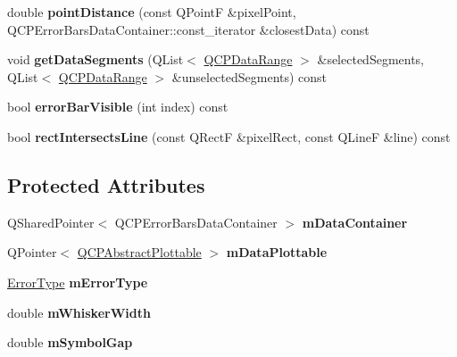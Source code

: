 \begin{DoxyCompactItemize}
\item 
double {\bfseries point\+Distance} (const Q\+PointF \&pixel\+Point, Q\+C\+P\+Error\+Bars\+Data\+Container\+::const\+\_\+iterator \&closest\+Data) const \hypertarget{classQCPErrorBars_a6701c510c6a0ad95d3335c6f2470eca0}{}\label{classQCPErrorBars_a6701c510c6a0ad95d3335c6f2470eca0}

\item 
void {\bfseries get\+Data\+Segments} (Q\+List$<$ \hyperlink{classQCPDataRange}{Q\+C\+P\+Data\+Range} $>$ \&selected\+Segments, Q\+List$<$ \hyperlink{classQCPDataRange}{Q\+C\+P\+Data\+Range} $>$ \&unselected\+Segments) const \hypertarget{classQCPErrorBars_a1e9fef8dd1853558c05d1235c1a1b033}{}\label{classQCPErrorBars_a1e9fef8dd1853558c05d1235c1a1b033}

\item 
bool {\bfseries error\+Bar\+Visible} (int index) const \hypertarget{classQCPErrorBars_ae654c5016cebd994b104684578358afe}{}\label{classQCPErrorBars_ae654c5016cebd994b104684578358afe}

\item 
bool {\bfseries rect\+Intersects\+Line} (const Q\+RectF \&pixel\+Rect, const Q\+LineF \&line) const \hypertarget{classQCPErrorBars_a4c2f5cf2afe52b702c07c977758b29dd}{}\label{classQCPErrorBars_a4c2f5cf2afe52b702c07c977758b29dd}

\end{DoxyCompactItemize}
\subsection*{Protected Attributes}
\begin{DoxyCompactItemize}
\item 
Q\+Shared\+Pointer$<$ Q\+C\+P\+Error\+Bars\+Data\+Container $>$ {\bfseries m\+Data\+Container}\hypertarget{classQCPErrorBars_a83c7f452d0eebd302a7e4fb3a1957634}{}\label{classQCPErrorBars_a83c7f452d0eebd302a7e4fb3a1957634}

\item 
Q\+Pointer$<$ \hyperlink{classQCPAbstractPlottable}{Q\+C\+P\+Abstract\+Plottable} $>$ {\bfseries m\+Data\+Plottable}\hypertarget{classQCPErrorBars_a14b6a5b49295990da84a05a3a89026bb}{}\label{classQCPErrorBars_a14b6a5b49295990da84a05a3a89026bb}

\item 
\hyperlink{classQCPErrorBars_a95f0220f11a72648b96480a85ce26474}{Error\+Type} {\bfseries m\+Error\+Type}\hypertarget{classQCPErrorBars_af9fd3117b86aac728c9e8e87c406ed9a}{}\label{classQCPErrorBars_af9fd3117b86aac728c9e8e87c406ed9a}

\item 
double {\bfseries m\+Whisker\+Width}\hypertarget{classQCPErrorBars_a3873724f7ac3392bdf9d46a47076a1d2}{}\label{classQCPErrorBars_a3873724f7ac3392bdf9d46a47076a1d2}

\item 
double {\bfseries m\+Symbol\+Gap}\hypertarget{classQCPErrorBars_a5cb5628b75e5aff0875710705666ec57}{}\label{classQCPErrorBars_a5cb5628b75e5aff0875710705666ec57}

\end{DoxyCompactItemize}
